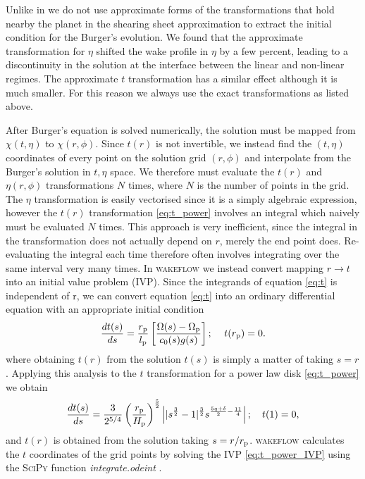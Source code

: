 Unlike in \citet{goodman2001,rafikov2002a,bollati2021} we do not use approximate forms of the transformations that hold nearby the planet in the shearing sheet approximation to extract the initial condition for the Burger's evolution.
We found that the approximate transformation for $\eta$ \citep[equations 35 in][]{rafikov2002a} shifted the wake profile in $\eta$ by a few percent, leading to a discontinuity in the solution at the interface between the linear and non-linear regimes.
The approximate $t$ transformation has a similar effect although it is much smaller.
For this reason we always use the exact transformations as listed above.

After Burger's equation is solved numerically, the solution must be mapped from $\chi(t,\eta)$ to $\chi(r,\phi)$.
Since $t(r)$ is not invertible, we instead find the $(t,\eta)$ coordinates of every point on the solution grid $(r,\phi)$ and interpolate from the Burger's solution in $t,\eta$ space.
We therefore must evaluate the $t(r)$ and $\eta(r,\phi)$ transformations $N$ times, where $N$ is the number of points in the grid.
The $\eta$ transformation is easily vectorised since it is a simply algebraic expression, however the $t(r)$ transformation \ref{eq:t_power} involves an integral which naively must be evaluated $N$ times.
This approach is very inefficient, since the integral in the transformation does not actually depend on $r$, merely the end point does.
Re-evaluating the integral each time therefore often involves integrating over the same interval very many times.
In \textsc{wakeflow} we instead convert mapping $r\rightarrow t$ into an initial value problem (IVP).
Since the integrands of equation \ref{eq:t} is independent of r, we can convert equation \ref{eq:t} into an ordinary differential equation with an appropriate initial condition
\begin{align}
    \frac{dt(s)}{ds} = \frac{r_{\rm p}}{l_{\rm p}} \left[ \frac{\Omega(s) - \Omega_{\rm p}}{c_0(s) g(s)} \right]; \quad \, t(r_{\rm p}) = 0.
\end{align}
where obtaining $t(r)$ from the solution $t(s)$ is simply a matter of taking $s=r$.
Applying this analysis to the $t$ transformation for a power law disk \ref{eq:t_power} we obtain 
\begin{align}
    \frac{dt(s)}{ds} = \frac{3}{2^{5/4}} \left( \frac{r_{\rm p}}{H_{\rm p}} \right)^{\frac{5}{2}} \left| |s^\frac{3}{2} - 1|^\frac{3}{2} s^{\frac{5q+\delta}{2}-\frac{11}{4}} \right|; \quad t(1)=0, \label{eq:t_power_IVP}
\end{align}
and $t(r)$ is obtained from the solution taking $s=r/r_{\rm p}$.
\textsc{wakeflow} calculates the $t$ coordinates of the grid points by solving the IVP \ref{eq:t_power_IVP} using the \textsc{SciPy} function \textit{integrate.odeint} \citep{virtanen2020}.

